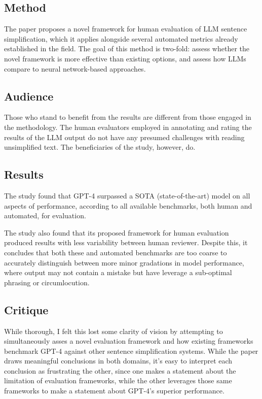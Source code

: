 \documentclass[
	letterpaper, %
]{jdf}
\begin{document}
\subsection{Method}
The paper proposes a novel framework for human evaluation of LLM sentence simplification, which it applies alongside several automated metrics already established in the field. The goal of this method is two-fold: assess whether the novel framework is more effective than existing options, and assess how LLMs compare to neural network-based approaches.

\subsection{Audience}
Those who stand to benefit from the results are different from those engaged in the methodology. The human evaluators employed in annotating and rating the results of the LLM output do not have any presumed challenges with reading unsimplified text. The beneficiaries of the study, however, do.

\subsection{Results}
The study found that GPT-4 surpassed a SOTA (state-of-the-art) model on all aspects of performance, according to all available benchmarks, both human and automated, for evaluation.

The study also found that its proposed framework for human evaluation produced results with less variability between human reviewer. Despite this, it concludes that both these and automated benchmarks are too coarse to accurately distinguish between more minor gradations in model performance, where output may not contain a mistake but have leverage a sub-optimal phrasing or circumlocution.

\subsection{Critique}
While thorough, I felt this lost some clarity of vision by attempting to simultaneously asses a novel evaluation framework and how existing frameworks benchmark GPT-4 against other sentence simplification systems. While the paper draws meaningful conclusions in both domains, it's easy to interpret each conclusion as frustrating the other, since one makes a statement about the limitation of evaluation frameworks, while the other leverages those same frameworks to make a statement about GPT-4's superior performance.
\end{document}
